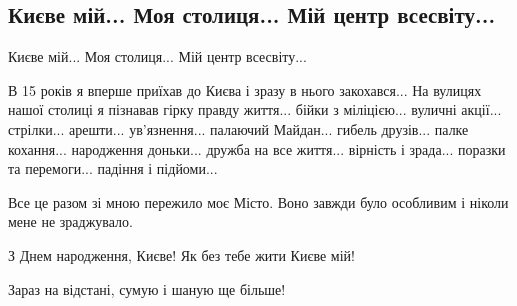  
 
 
 
 

\subsection{Києве мій... Моя столиця... Мій центр всесвіту...}

Києве мій... Моя столиця... Мій центр всесвіту...

В 15 років я вперше приїхав до Києва і зразу в нього закохався... На вулицях
нашої столиці я пізнавав гірку правду життя... бійки з міліцією... вуличні
акції... стрілки... арешти... ув'язнення... палаючий Майдан... гибель друзів...
палке кохання... народження доньки... дружба на все життя... вірність і
зрада... поразки та перемоги... падіння і підйоми...

Все це разом зі мною пережило моє Місто. Воно завжди було особливим і ніколи
мене не зраджувало.

З Днем народження, Києве! Як без тебе жити Києве мій!

Зараз на відстані, сумую і шаную ще більше!
